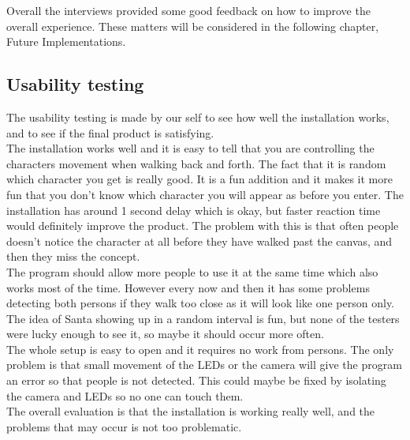 Overall the interviews provided some good feedback on how to improve the overall experience. These matters will be considered in the following chapter, Future Implementations.

\subsection{Usability testing}

The usability testing is made by our self to see how well the installation works, and to see if the final product is satisfying. \\
The installation works well and it is easy to tell that you are controlling the characters movement when walking back and forth. The fact that it is random which character you get is really good. It is a fun addition and it makes it more fun that you don't know which character you will appear as before you enter. The installation has around 1 second delay which is okay, but faster reaction time would definitely improve the product. The problem with this is that often people doesn't notice the character at all before they have walked past the canvas, and then they miss the concept. \\
The program should allow more people to use it at the same time which also works most of the time. However every now and then it has some problems detecting both persons if they walk too close as it will look like one person only.
The idea of Santa showing up in a random interval is fun, but none of the testers were lucky enough to see it, so maybe it should occur more often.\\
The whole setup is easy to open and it requires no work from persons. The only problem is that small movement of the LEDs or the camera will give the program an error so that people is not detected. This could maybe be fixed by isolating the camera and LEDs so no one can touch them.\\
The overall evaluation is that the installation is working really well, and the problems that may occur is not too problematic. 

